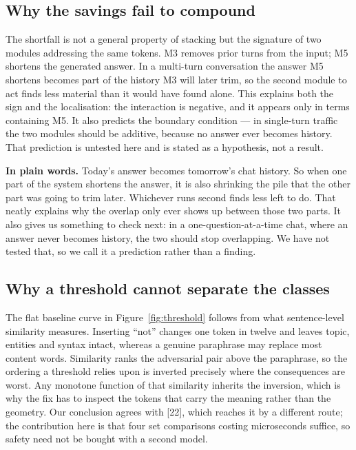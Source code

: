 \documentclass[11pt,a4paper]{article}
\newcommand{\plain}[1]{%
  \par\vspace{1pt}
  \noindent\begin{tcolorbox}[colback=plainblue,colframe=plainrule,boxrule=0pt,
    leftrule=2.2pt,arc=0pt,left=7pt,right=5pt,top=4pt,bottom=4pt,breakable]
  \small\textbf{In plain words.} #1
  \end{tcolorbox}\par\vspace{2pt}}
\begin{document}
\subsection{Why the savings fail to compound}
The shortfall is not a general property of stacking but the signature of two
modules addressing the same tokens. M3 removes prior turns from the input; M5
shortens the generated answer. In a multi-turn conversation the answer M5 shortens
becomes part of the history M3 will later trim, so the second module to act finds
less material than it would have found alone. This explains both the sign and the
localisation: the interaction is negative, and it appears only in terms containing
M5. It also predicts the boundary condition --- in single-turn traffic the two
modules should be additive, because no answer ever becomes history. That
prediction is untested here and is stated as a hypothesis, not a result.

\plain{Today's answer becomes tomorrow's chat history. So when one part of the
system shortens the answer, it is also shrinking the pile that the other part was
going to trim later. Whichever runs second finds less left to do. That neatly
explains why the overlap only ever shows up between those two parts. It also
gives us something to check next: in a one-question-at-a-time chat, where an
answer never becomes history, the two should stop overlapping. We have not tested
that, so we call it a prediction rather than a finding.}

\subsection{Why a threshold cannot separate the classes}
The flat baseline curve in Figure~\ref{fig:threshold} follows from what
sentence-level similarity measures. Inserting ``not'' changes one token in twelve
and leaves topic, entities and syntax intact, whereas a genuine paraphrase may
replace most content words. Similarity ranks the adversarial pair above the
paraphrase, so the ordering a threshold relies upon is inverted precisely where
the consequences are worst. Any monotone function of that similarity inherits the
inversion, which is why the fix has to inspect the tokens that carry the meaning
rather than the geometry. Our conclusion agrees with [22], which reaches it by a
different route; the contribution here is that four set comparisons costing
microseconds suffice, so safety need not be bought with a second model.
\end{document}

